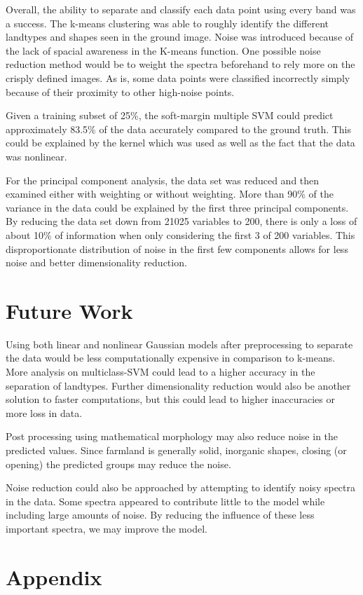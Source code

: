 \documentclass[10pt,letterpaper]{article}
\begin{document}
Overall, the ability to separate and classify each data point using every band was a success. The k-means clustering was able to roughly identify the different landtypes and shapes seen in the ground image. Noise was introduced because of the lack of spacial awareness in the K-means function. One possible noise reduction method would be to weight the spectra beforehand to rely more on the crisply defined images. As is, some data points were classified incorrectly simply because of their proximity to other high-noise points.

Given a training subset of 25\%, the soft-margin multiple SVM could predict approximately 83.5\% of the data accurately compared to the ground truth. This could be explained by the kernel which was used as well as the fact that the data was nonlinear.

For the principal component analysis, the data set was reduced and then examined either with weighting or without weighting. More than 90\% of the variance in the data could be explained by the first three principal components. By reducing the data set down from 21025 variables to 200, there is only a loss of about 10\% of information when only considering the first 3 of 200 variables. This disproportionate distribution of noise in the first few components allows for less noise and better dimensionality reduction. 
\section{Future Work}
Using both linear and nonlinear Gaussian models after preprocessing to separate the data would be less computationally expensive in comparison to k-means. More analysis on multiclass-SVM could lead to a higher accuracy in the separation of landtypes. Further dimensionality reduction would also be another solution to faster computations, but this could lead to higher inaccuracies or more loss in data.

Post processing using mathematical morphology may also reduce noise in the predicted values. Since farmland is generally solid, inorganic shapes, closing (or opening) the predicted groups may reduce the noise.

Noise reduction could also be approached by attempting to identify noisy spectra in the data. Some spectra appeared to contribute little to the model while including large amounts of noise. By reducing the influence of these less important spectra, we may improve the model.
\pagebreak
\section{Appendix}
\end{document}
